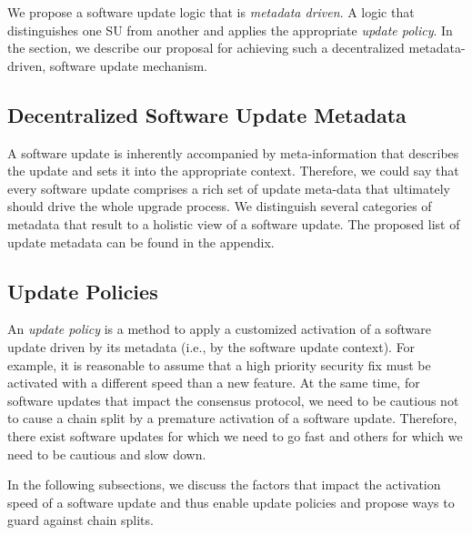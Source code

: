 We propose a software update logic that is \emph{metadata driven}. A logic that distinguishes one SU from another and applies the appropriate \emph{update policy}. In the section, we describe our proposal for achieving such a decentralized metadata-driven, software update mechanism.

\subsection{Decentralized Software Update Metadata} 
A software update is inherently accompanied by meta-information that describes the update and sets it into the appropriate context. Therefore, we could say that every software update comprises a rich set of update meta-data that ultimately should drive the whole upgrade process. We distinguish several categories of metadata that result to a holistic view of a software update. The proposed list of update metadata can be found in the appendix. %


\subsection{Update Policies} 
An \emph{update policy} is a method to apply a customized activation of a software update driven by its metadata (i.e., by the software update context). For example, it is reasonable to assume that a high priority security fix must be activated with a different speed than a  new feature. At the same time, for software updates that impact the consensus protocol, we need to be cautious not to cause a chain split by a premature activation of a software update. Therefore, there exist software updates for which we need to go fast and others for which we need to be cautious and slow down.

In the following subsections, we discuss the factors that impact the activation speed of a software update and thus enable update policies and propose ways to guard against chain splits.
 
